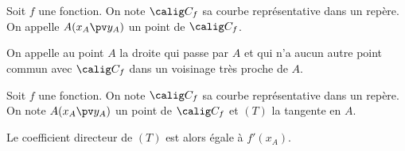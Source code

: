 \documentclass[10pt,openright,twoside,french]{book}
\begin{document}
\begin{Defi}
    Soit $f$ une fonction. On note $\calig C_f$ sa courbe représentative dans un repère. On appelle $A(x_A\pv y_A)$ un point de $\calig C_f$.\par
    On appelle  au point $A$ la droite qui passe par $A$ et qui n'a aucun autre point commun avec $\calig C_f$ dans un voisinage très proche de $A$.
    \begin{center}
    \end{center}
\end{Defi}

\begin{Prop}[(admise)]
    Soit $f$ une fonction. On note $\calig C_f$ sa courbe représentative dans un repère. On note $A(x_A\pv y_A)$ un point de $\calig C_f$ et $(T)$ la tangente en $A$.\par
    Le c{oe}fficient directeur de $(T)$ est alors égale à $f'(x_A)$.
\end{Prop}
\end{document}
